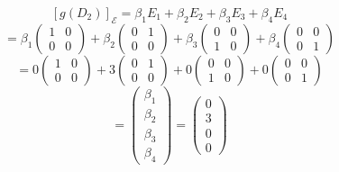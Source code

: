 \documentclass[a4paper]{article}
\theoremstyle{break}
\theoremstyle{break}
\theoremstyle{break}
\theoremstyle{break}
\begin{document}
\begin{enumerate}
        \[
          [g(D_2)]_{\mathcal{E}} = \beta_1 E_1 + \beta_2 E_2 + \beta_3 E_3 + \beta_4 E_4
        \] 
        \[
        = \beta_1 \begin{pmatrix} 
          1 & 0\\
          0 & 0
        \end{pmatrix}
        + \beta_2 \begin{pmatrix} 
          0 & 1\\
          0 & 0
        \end{pmatrix}
        + \beta_3 \begin{pmatrix} 
          0 & 0\\
          1 & 0
        \end{pmatrix}
        + \beta_4 \begin{pmatrix} 
          0 & 0\\
          0 & 1
        \end{pmatrix}
        \]
        \[
        = 0 \begin{pmatrix} 
          1 & 0\\
          0 & 0
        \end{pmatrix}
        + 3 \begin{pmatrix} 
          0 & 1\\
          0 & 0
        \end{pmatrix}
        + 0 \begin{pmatrix} 
          0 & 0\\
          1 & 0
        \end{pmatrix}
        + 0 \begin{pmatrix} 
          0 & 0\\
          0 & 1
        \end{pmatrix}
        \] 
        \[
        = \begin{pmatrix} 
          \beta_1\\
          \beta_2\\
          \beta_3\\
          \beta_4
        \end{pmatrix}
        = \begin{pmatrix} 
          0\\
          3\\
          0\\
          0
        \end{pmatrix}
        \] 


\end{enumerate}
\end{document}
